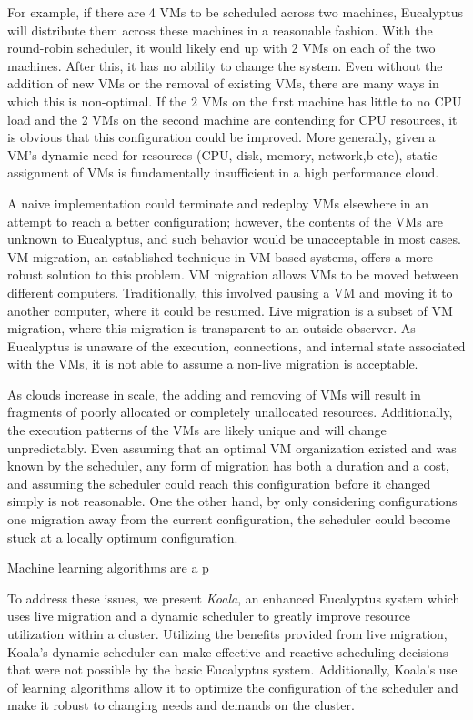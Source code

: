 For example, if there are 4 VMs to be scheduled across two machines, Eucalyptus will distribute them across these machines in a reasonable fashion.  With the round-robin scheduler, it would likely end up with 2 VMs on each of the two machines.  After this, it has no ability to change the system.  Even without the addition of new VMs or the removal of existing VMs, there are many ways in which this is non-optimal.  If the 2 VMs on the first machine has little to no CPU load and the 2 VMs on the second machine are contending for CPU resources, it is obvious that this configuration could be improved.  More generally, given a VM's dynamic need for resources (CPU, disk, memory, network,b etc), static assignment of VMs is fundamentally insufficient in a high performance cloud.

A naive implementation could terminate and redeploy VMs elsewhere in an attempt to reach a better configuration;  however, the contents of the VMs are unknown to Eucalyptus, and such behavior would be unacceptable in most cases.  VM migration, an established technique in VM-based systems, offers a more robust solution to this problem.  VM migration allows VMs to be moved between different computers.  Traditionally, this involved pausing a VM and moving it to another computer, where it could be resumed.  Live migration is a subset of VM migration, where this migration is transparent to an outside observer.  As Eucalyptus is unaware of the execution, connections, and internal state associated with the VMs, it is not able to assume a non-live migration is acceptable.  

As clouds increase in scale, the adding and removing of VMs will result in fragments of poorly allocated or completely unallocated resources.  Additionally, the execution patterns of the VMs are likely unique and will change unpredictably.  Even assuming that an optimal VM organization existed and was known by the scheduler, any form of migration has both a duration and a cost, and assuming the scheduler could reach this configuration before it changed simply is not reasonable.  One the other hand, by only considering configurations one migration away from the current configuration, the scheduler could become stuck at a locally optimum configuration.

Machine learning algorithms are a p

To address these issues, we present \emph{Koala}, an enhanced Eucalyptus system which uses live migration and a dynamic scheduler to greatly improve resource utilization within a cluster.  Utilizing the benefits provided from live migration, Koala's dynamic scheduler can make effective and reactive scheduling decisions that were not possible by the basic Eucalyptus system.  Additionally, Koala's use of learning algorithms allow it to optimize the configuration of the scheduler and make it robust to changing needs and demands on the cluster.

